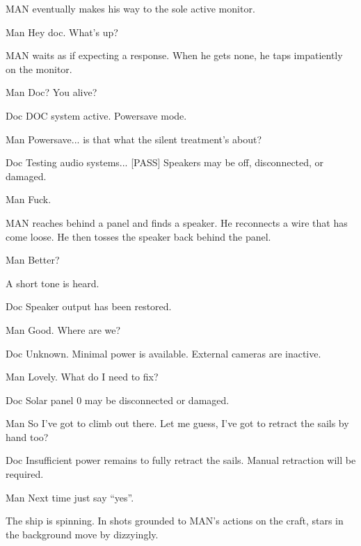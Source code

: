 \documentclass{screenplay}[2010/1/7]
\begin{document}
MAN eventually makes his way to the sole active monitor.
\begin{dialogue}{Man}
Hey doc.  What's up?
\end{dialogue}
MAN waits as if expecting a response.  When he gets none, he taps impatiently on the monitor.
\begin{dialogue}{Man}
Doc?  You alive?
\end{dialogue}
\begin{dialogue}[on-screen]{Doc}
DOC system active.
Powersave mode.
\end{dialogue}
\begin{dialogue}{Man}
Powersave... is that what the silent treatment's about?
\end{dialogue}
\begin{dialogue}[on-screen]{Doc}
Testing audio systems... [PASS]
Speakers may be off, disconnected, or damaged.
\end{dialogue}
\begin{dialogue}{Man}
Fuck.
\end{dialogue}
MAN reaches behind a panel and finds a speaker.  He reconnects a wire that has come loose.  He then tosses the speaker back behind the panel.
\begin{dialogue}{Man}
Better?
\end{dialogue}
A short tone is heard.
\begin{dialogue}{Doc}
Speaker output has been restored.
\end{dialogue}
\begin{dialogue}{Man}
Good.  Where are we?
\end{dialogue}
\begin{dialogue}{Doc}
Unknown.  Minimal power is available.  External cameras are inactive.
\end{dialogue}
\begin{dialogue}{Man}
Lovely.  What do I need to fix?
\end{dialogue}
\begin{dialogue}{Doc}
Solar panel 0 may be disconnected or damaged.
\end{dialogue}
\begin{dialogue}{Man}
So I've got to climb out there.  Let me guess, I've got to retract the sails by hand too?
\end{dialogue}
\begin{dialogue}{Doc}
Insufficient power remains to fully retract the sails.  Manual retraction will be required.
\end{dialogue}
\begin{dialogue}{Man}
Next time just say ``yes''.
\end{dialogue}
The ship is spinning.  In shots grounded to MAN's actions on the craft, stars in the background move by dizzyingly.
\end{document}
